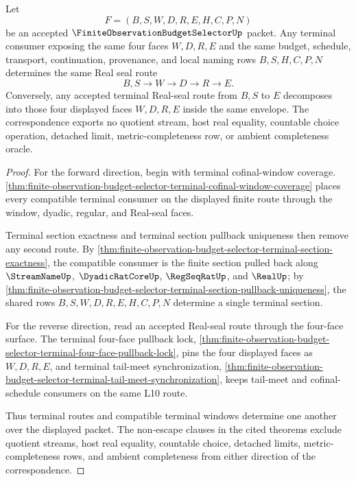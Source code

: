 \begin{theorem}
\label{thm:finite-observation-budget-selector-terminal-window-seal-inversion}
Let
$$
F=(B,S,W,D,R,E,H,C,P,N)
$$
be an accepted $\FiniteObservationBudgetSelectorUp$ packet. Any terminal consumer exposing the same four faces $W,D,R,E$ and the same budget, schedule, transport, continuation, provenance, and local naming rows $B,S,H,C,P,N$ determines the same Real seal route
$$
B,S \to W \to D \to R \to E.
$$
Conversely, any accepted terminal Real-seal route from $B,S$ to $E$ decomposes into those four displayed faces $W,D,R,E$ inside the same envelope. The correspondence exports no quotient stream, host real equality, countable choice operation, detached limit, metric-completeness row, or ambient completeness oracle.
\end{theorem}
\begin{proof}
For the forward direction, begin with terminal cofinal-window coverage. \autoref{thm:finite-observation-budget-selector-terminal-cofinal-window-coverage} places every compatible terminal consumer on the displayed finite route through the window, dyadic, regular, and Real-seal faces.

Terminal section exactness and terminal section pullback uniqueness then remove any second route. By \autoref{thm:finite-observation-budget-selector-terminal-section-exactness}, the compatible consumer is the finite section pulled back along $\StreamNameUp$, $\DyadicRatCoreUp$, $\RegSeqRatUp$, and $\RealUp$; by \autoref{thm:finite-observation-budget-selector-terminal-section-pullback-uniqueness}, the shared rows $B,S,W,D,R,E,H,C,P,N$ determine a single terminal section.

For the reverse direction, read an accepted Real-seal route through the four-face surface. The terminal four-face pullback lock, \autoref{thm:finite-observation-budget-selector-terminal-four-face-pullback-lock}, pins the four displayed faces as $W,D,R,E$, and terminal tail-meet synchronization, \autoref{thm:finite-observation-budget-selector-terminal-tail-meet-synchronization}, keeps tail-meet and cofinal-schedule consumers on the same L10 route.

Thus terminal routes and compatible terminal windows determine one another over the displayed packet. The non-escape clauses in the cited theorems exclude quotient streams, host real equality, countable choice, detached limits, metric-completeness rows, and ambient completeness from either direction of the correspondence.
\end{proof}

